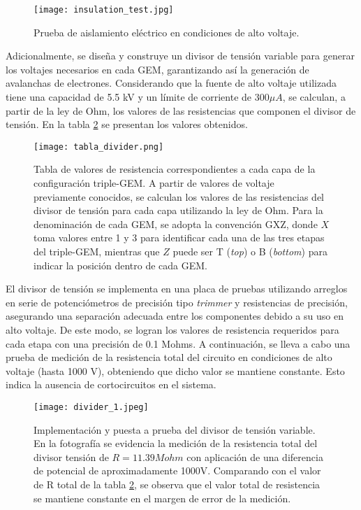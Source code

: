 \documentclass{report}
\begin{document}
\begin{figure}[H]
    \centering
    \texttt{[image: insulation\_test.jpg]}
    \caption{Prueba de aislamiento eléctrico en condiciones de alto voltaje.}
    \label{fig:ins_test}
\end{figure}

\noindent Adicionalmente, se diseña y construye un divisor de tensión variable para generar los voltajes necesarios en cada GEM, garantizando así la generación de avalanchas de electrones. Considerando que la fuente de alto voltaje utilizada tiene una capacidad de 5.5 kV y un límite de corriente de 300$\mu A$, se calculan, a partir de la ley de Ohm, los valores de las resistencias que componen el divisor de tensión. En la tabla \ref{fig:divider_table} se presentan los valores obtenidos.  \\

\begin{figure}[H]
    \centering
    \texttt{[image: tabla\_divider.png]}
    \caption{\noindent Tabla de valores de resistencia correspondientes a cada capa de la configuración triple-GEM. A partir de valores de voltaje previamente conocidos, se calculan los valores de las resistencias del divisor de tensión para cada capa utilizando la ley de Ohm. Para la denominación de cada GEM, se adopta la convención GXZ, donde $X$ toma valores entre 1 y 3 para identificar cada una de las tres etapas del triple-GEM, mientras que $Z$ puede ser T (\textit{top}) o B (\textit{bottom}) para indicar la posición dentro de cada GEM.}
    \label{fig:divider_table}
\end{figure}

\noindent El divisor de tensión se implementa en una placa de pruebas utilizando arreglos en serie de potenciómetros de precisión tipo \textit{trimmer} y resistencias de precisión, asegurando una separación adecuada entre los componentes debido a su uso en alto voltaje. De este modo, se logran los valores de resistencia requeridos para cada etapa con una precisión de 0.1 Mohms. A continuación, se lleva a cabo una prueba de medición de la resistencia total del circuito en condiciones de alto voltaje (hasta 1000 V), obteniendo que dicho valor se mantiene constante. Esto indica la ausencia de cortocircuitos en el sistema.  \\

\begin{figure}[H]
    \centering
    \texttt{[image: divider\_1.jpeg]}
    \caption{Implementación y puesta a prueba del divisor de tensión variable. En la fotografía se evidencia la medición de la resistencia total del divisor tensión de $R = 11.39 Mohm$ con aplicación de una diferencia de potencial de aproximadamente 1000V. Comparando con el valor de R total de la tabla \ref{fig:divider_table}, se observa que el valor total de resistencia se mantiene constante en el margen de error de la medición.}
    \label{fig:div1}
\end{figure}
\end{document}
